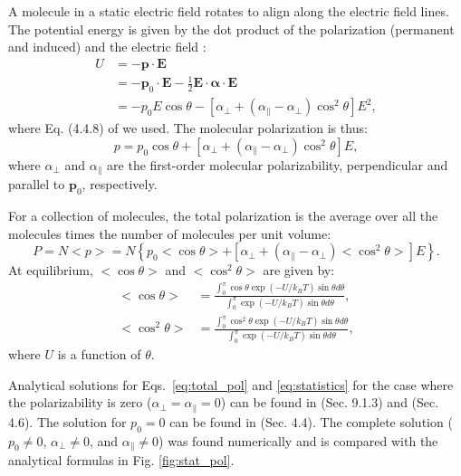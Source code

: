 \documentclass[12pt,letterpaper]{article}
\begin{document}
A molecule in a static electric field rotates to align along the electric field lines. The potential energy is given by the dot product of the polarization (permanent and induced) and the electric field \cite{bonin1997}:
\begin{align}\label{eq:potential}
U &= -\mathbf{p}\cdot\mathbf{E}\nonumber\\
&=-\mathbf{p}_0\cdot\mathbf{E} - \frac{1}{2}\mathbf{E}\cdot\mathbf{\boldsymbol\alpha}\cdot\mathbf{E}\nonumber\\
&= -p_0E\cos\theta-\left[\alpha_\bot + (\alpha_\parallel - \alpha_\bot)\cos^2\theta\right]E^2,
\end{align}
where Eq. (4.4.8) of \cite{boyd2008} we used. The molecular polarization is thus:
\begin{equation}\label{eq:single_pol}
 p = p_0\cos\theta+\left[\alpha_\bot + (\alpha_\parallel - \alpha_\bot)\cos^2\theta\right]E,
\end{equation}
where $\alpha_\bot$ and $\alpha_\parallel$ are the first-order molecular polarizability, perpendicular and parallel to $\mathbf{p}_0$, respectively.

For a collection of molecules, the total polarization is the average over all the molecules times the number of molecules per unit volume:
\begin{equation}\label{eq:total_pol}
 P=N<p>=N\left\lbrace p_0<\cos\theta>+\left[\alpha_\bot + (\alpha_\parallel - \alpha_\bot)<\cos^2\theta>\right]E\right\rbrace.
\end{equation}
At equilibrium, $<\cos\theta>$ and $<\cos^2\theta>$ are given by:
\begin{subequations}\label{eq:statistics}
 \begin{align}
  <\cos\theta>&=\frac{\int_0^\pi\cos\theta\exp(-U/k_BT)\sin\theta d\theta}{\int_0^\pi\exp(-U/k_BT)\sin\theta d\theta},\\
  <\cos^2\theta>&=\frac{\int_0^\pi\cos^2\theta\exp(-U/k_BT)\sin\theta d\theta}{\int_0^\pi\exp(-U/k_BT)\sin\theta d\theta},
 \end{align}
\end{subequations}
where $U$ is a function of $\theta$. 

Analytical solutions for Eqs.~\eqref{eq:total_pol} and \eqref{eq:statistics} for the case where the polarizability is zero ($\alpha_\bot = \alpha_\parallel=0$) can be found in \cite{hook1991} (Sec. 9.1.3) and \cite{jackson1999} (Sec. 4.6). The solution for $p_0 = 0$ can be found in \cite{boyd2008} (Sec. 4.4). The complete solution ($p_0\neq 0$, $\alpha_\bot\neq 0$, and $\alpha_\parallel\neq 0$) was found numerically and is compared with the analytical formulas in Fig. \ref{fig:stat_pol}.
\end{document}
